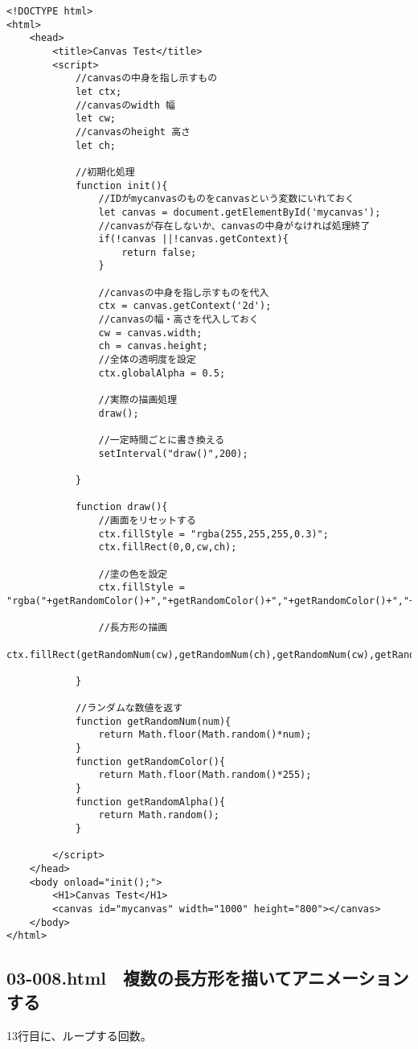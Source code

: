 \documentclass[mingoth,11pt,a4j,uplatex]{jsarticle}
\begin{document}
\begin{lstlisting}[caption=全体の透明度を設定してみる]
<!DOCTYPE html>
<html>
	<head>
		<title>Canvas Test</title>
		<script>
			//canvasの中身を指し示すもの
			let ctx;
			//canvasのwidth 幅
			let cw;
			//canvasのheight 高さ
			let ch;
			
			//初期化処理
			function init(){
				//IDがmycanvasのものをcanvasという変数にいれておく
				let canvas = document.getElementById('mycanvas');
				//canvasが存在しないか、canvasの中身がなければ処理終了
				if(!canvas ||!canvas.getContext){
					return false;
				}
				
				//canvasの中身を指し示すものを代入
				ctx = canvas.getContext('2d');
				//canvasの幅・高さを代入しておく
				cw = canvas.width;
				ch = canvas.height;
				//全体の透明度を設定
				ctx.globalAlpha = 0.5;
				
				//実際の描画処理
				draw();
				
				//一定時間ごとに書き換える
				setInterval("draw()",200);

			}
			
			function draw(){
				//画面をリセットする
				ctx.fillStyle = "rgba(255,255,255,0.3)";
				ctx.fillRect(0,0,cw,ch);
				
				//塗の色を設定
				ctx.fillStyle = "rgba("+getRandomColor()+","+getRandomColor()+","+getRandomColor()+","+getRandomAlpha()+")";
				
				//長方形の描画
				ctx.fillRect(getRandomNum(cw),getRandomNum(ch),getRandomNum(cw),getRandomNum(ch));

			}
			
			//ランダムな数値を返す
			function getRandomNum(num){
				return Math.floor(Math.random()*num);
			}
			function getRandomColor(){
				return Math.floor(Math.random()*255);
			}
			function getRandomAlpha(){
				return Math.random();
			}

		</script>
	</head>
	<body onload="init();">
		<H1>Canvas Test</H1>
		<canvas id="mycanvas" width="1000" height="800"></canvas>
	</body>
</html>
\end{lstlisting}

\subsection{03-008.html　複数の長方形を描いてアニメーションする}
13行目に、ループする回数。
\end{document}
